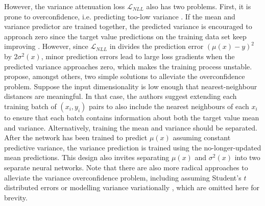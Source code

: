 \newpar However, the variance attenuation loss $\mathcal{L}_{NLL}$ also has two problems. First, it is prone to overconfidence, i.e. predicting too-low variance \cite{reliable-variance-2019}. If the mean and variance predictor are trained together, the predicted variance is encouraged to approach zero since the target value predictions on the training data set keep improving \cite{variational-variance-2020}. However, since $\mathcal{L}_{NLL}$ in  divides the prediction error $(\mu(x) - y)^2$ by $2 \sigma^2(x)$, minor prediction errors lead to large loss gradients when the predicted variance approaches zero, which makes the training process unstable. \textcite{reliable-variance-2019} propose, amongst others, two simple solutions to alleviate the overconfidence problem. Suppose the input dimensionality is low enough that nearest-neighbour distances are meaningful. In that case, the authors suggest extending each training batch of $(x_i, y_i)$ pairs to also include the nearest neighbours of each $x_i$ to ensure that each batch contains information about both the target value mean and variance. Alternatively, training the mean and variance should be separated. After the network has been trained to predict $\mu(x)$ assuming constant predictive variance, the variance prediction is trained using the no-longer-updated mean predictions. This design also invites separating $\mu(x)$ and $\sigma^2(x)$ into two separate neural networks. Note that there are also more radical approaches to alleviate the variance overconfidence problem, including assuming Student's $t$ distributed errors \cite{reliable-variance-2019} or modelling variance variationally \cite{variational-variance-2020}, which are omitted here for brevity.

